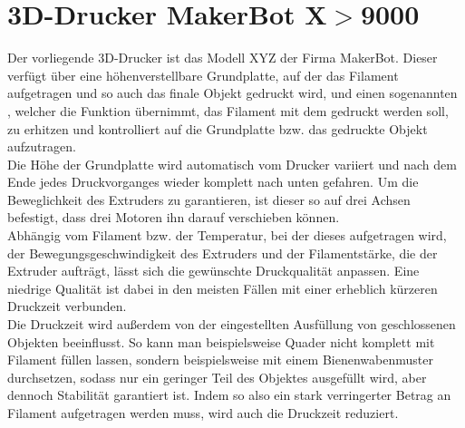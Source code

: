 \section{3D-Drucker MakerBot X$>$9000}
Der vorliegende 3D-Drucker ist das Modell XYZ der Firma MakerBot.
Dieser verfügt über eine höhenverstellbare Grundplatte, auf der das Filament aufgetragen und so auch das finale Objekt gedruckt wird, und einen sogenannten , welcher die Funktion übernimmt, das Filament mit dem gedruckt werden soll, zu erhitzen und kontrolliert auf die Grundplatte bzw. das gedruckte Objekt aufzutragen. \\
Die Höhe der Grundplatte wird automatisch vom Drucker variiert und nach dem Ende jedes Druckvorganges wieder komplett nach unten gefahren.
Um die Beweglichkeit des Extruders zu garantieren, ist dieser so auf drei Achsen befestigt, dass drei Motoren ihn darauf verschieben können. \\
Abhängig vom Filament bzw. der Temperatur, bei der dieses aufgetragen wird, der Bewegungsgeschwindigkeit des Extruders und der Filamentstärke, die der Extruder aufträgt, lässt sich die gewünschte Druckqualität anpassen.
Eine niedrige Qualität ist dabei in den meisten Fällen mit einer erheblich kürzeren Druckzeit verbunden. \\
Die Druckzeit wird außerdem von der eingestellten Ausfüllung von geschlossenen Objekten beeinflusst.
So kann man beispielsweise Quader nicht komplett mit Filament füllen lassen, sondern beispielsweise mit einem Bienenwabenmuster durchsetzen, sodass nur ein geringer Teil des Objektes ausgefüllt wird, aber dennoch Stabilität garantiert ist.
Indem so also ein stark verringerter Betrag an Filament aufgetragen werden muss, wird auch die Druckzeit reduziert.